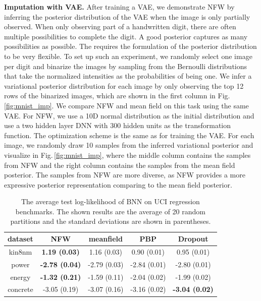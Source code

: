 \documentclass{article}
\newcommand{\acr}[1]{\textsc{#1}\xspace}
\newcommand{\us}{\acr{NFW}}
\begin{document}
\textbf{Imputation with VAE.} After training a VAE, we demonstrate \us by inferring the posterior distribution of the VAE when the image is only partially observed. When only observing part of a handwritten digit, there are often multiple possibilities to complete the digit. A good posterior captures as many possibilities as possible. The requires the formulation of the posterior distribution to be very flexible. To set up such an experiment, we randomly select one image per digit and binarize the images by sampling from the Bernoulli distributions that take the normalized intensities as the probabilities of being one. We infer a variational posterior distribution for each image by only observing the top 12 rows of the binarized images, which are shown in the first column in Fig.\,\ref{fig:mnist_imp}. We compare \us and mean field on this task using the same VAE. For \us, we use a 10D normal distribution as the initial distribution and use a two hidden layer DNN with 300 hidden units as the transformation function. The optimization scheme is the same as for training the VAE. For each image, we randomly draw 10 samples from the inferred variational posterior and visualize in Fig.\,\ref{fig:mnist_imp}, where the middle column contains the samples from \us and the right column contains the samples from the mean field posterior. The samples from \us are more diverse, as \us provides a more expressive posterior representation comparing to the mean field posterior.


\begin{table}
\centering
 \begin{tabular}{c c c c c} 
 \hline
 dataset & \us & meanfield  & PBP & Dropout \\ [0.5ex] 
 \hline\hline
 kin8nm & \textbf{1.19 (0.03)} & 1.16 (0.03) &  0.90 (0.01) & 0.95 (0.01)\\ 
 power & \textbf{-2.78 (0.04)} &  -2.79 (0.03) & -2.84 (0.01) & -2.80 (0.01)\\
 energy & \textbf{-1.32 (0.21)} & -1.59 (0.11)  & -2.04 (0.02) & -1.99 (0.02)\\
 concrete & -3.05 (0.19) & -3.07 (0.16) & -3.16 (0.02) & \textbf{-3.04 (0.02)}\\
 \hline
\end{tabular}
\vspace{1mm}
\caption{The average test log-likelihood of BNN on UCI regression benchmarks. The shown results are the average of 20 random partitions and the standard deviations are shown in parentheses.} \label{tab:bnn_regression}
\vspace{-5mm}
\end{table}
\end{document}
